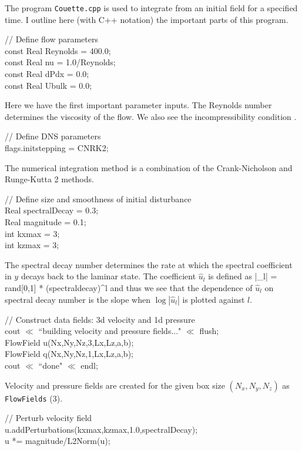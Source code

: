 \documentclass[pre,twocolumn,groupedaddress]{revtex4}
\begin{document}
  The program {\tt Couette.cpp} is used to integrate
 {\pCf}
 from an initial field for a specified time. I outline here (with C++ notation) the important parts of this
 program.

  \noindent // Define flow parameters \\
  const Real Reynolds = 400.0; \\
  const Real nu = 1.0/Reynolds; \\
  const Real dPdx = 0.0; \\
  const Real Ubulk = 0.0;

Here we have the first important parameter inputs. The Reynolds
number  determines the viscosity of the flow. We also
see the incompressibility condition .


 \noindent // Define DNS parameters \\
 flags.initstepping = CNRK2;


The numerical integration method is a combination of the
Crank-Nicholson and Runge-Kutta 2 methods.

 \noindent  // Define size and smoothness of initial disturbance \\
  Real spectralDecay = 0.3; \\
  Real magnitude  = 0.1; \\
  int kxmax = 3; \\
  int kzmax = 3;

The spectral decay number determines the rate at which the spectral
coefficient in $y$ decays back to the laminar state. The coefficient
$\hat{u}_{l}$ is defined as
\beq
|_{l}| = \mbox{rand}[0,1] *
(\mbox{spectraldecay})^{l}
\eeq
and thus we see that the dependence of
$\hat{u}_{l}$ on spectral decay number is the slope when
$\log |\hat{u}_{l}|$ is plotted against $l$.


  \noindent  // Construct data fields: 3d velocity and 1d pressure \\
  cout $\ll$ ``building velocity and pressure fields..." $\ll$ flush; \\
  FlowField u(Nx,Ny,Nz,3,Lx,Lz,a,b); \\
  FlowField q(Nx,Ny,Nz,1,Lx,Lz,a,b); \\
  cout $\ll$ ``done" $\ll$ endl;

  Velocity and pressure fields are created for the given box size
  $(N_x,N_y,N_z)$ as {\verb"FlowFields"} (3).


  \noindent // Perturb velocity field \\
  u.addPerturbations(kxmax,kzmax,1.0,spectralDecay); \\
  u *= magnitude/L2Norm(u);
\end{document}
